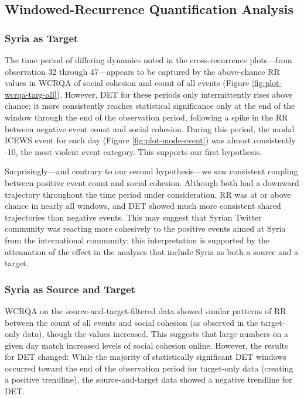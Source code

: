 \documentclass[english,man]{apa6}
\begin{document}
\hypertarget{windowed-recurrence-quantification-analysis}{%
\subsection{Windowed-Recurrence Quantification Analysis}\label{windowed-recurrence-quantification-analysis}}

\hypertarget{syria-as-target-3}{%
\subsubsection{Syria as Target}\label{syria-as-target-3}}

The time period of differing dynamics noted in the cross-recurrence plots---from
observation 32 through 47---appears to be captured by the above-chance RR values
in WCRQA of social cohesion and count of all events (Figure
\ref{fig:plot-wcrqa-targ-all}). However, DET for these periods only
intermittently rises above chance; it more consistently reaches statistical
significance only at the end of the window through the end of the observation
period, following a spike in the RR between negative event count and social
cohesion. During this period, the modal ICEWS event for each day (Figure
\ref{fig:plot-mode-event}) was almost consistently -10, the most violent event
category. This supports our first hypothesis.

Surprisingly---and contrary to our second hypothesis---we saw consistent
coupling between positive event count and social cohesion. Although both had a
downward trajectory throughout the time period under consideration, RR was at or
above chance in nearly all windows, and DET showed much more consistent shared
trajectories than negative events. This may suggest that Syrian Twitter
community was reacting more cohesively to the positive events aimed at Syria
from the international community; this interpretation is supported by the
attenuation of the effect in the analyses that include Syria as both a source
and a target.

\hypertarget{syria-as-source-and-target-3}{%
\subsubsection{Syria as Source and Target}\label{syria-as-source-and-target-3}}

WCRQA on the source-and-target-filtered data showed similar patterns of RR
between the count of all events and social cohesion (as observed in the
target-only data), though the values increased. This suggests that large numbers
on a given day match increased levels of social cohesion online. However, the
results for DET changed: While the majority of statistically significant DET
windows occurred toward the end of the observation period for target-only data
(creating a positive trendline), the source-and-target data showed a negative
trendline for DET.
\end{document}
